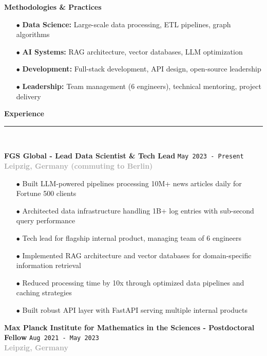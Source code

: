 \documentclass[11pt,a4paper]{article}
\newcommand{\sectiondivider}{%
    \vspace{2pt}\\%
    {\color{verdigris}\rule{30pt}{2pt}}\\%
    \vspace{8pt}%
}
\newcommand{\verdigrisbullet}{{\color{verdigris}$\bullet$}\space}
\newcommand{\jobduration}[1]{%
    \textcolor{mediumgray}{\texttt{\small #1}}%
}
\newcommand{\companyname}[1]{%
    \textcolor{darkgray}{\textbf{#1}}%
}
\newcommand{\cvsectioncustom}[1]{%
    \vspace{12pt}%
    {\Large\color{navy}\textbf{#1}}%
    \sectiondivider%
}
\begin{document}
\vspace{6pt}
\textbf{Methodologies \& Practices}
\begin{itemize}[leftmargin=15pt,itemsep=2pt]
    \item[\verdigrisbullet] \textbf{Data Science:} Large-scale data processing, ETL pipelines, graph algorithms
    \item[\verdigrisbullet] \textbf{AI Systems:} RAG architecture, vector databases, LLM optimization
    \item[\verdigrisbullet] \textbf{Development:} Full-stack development, API design, open-source leadership
    \item[\verdigrisbullet] \textbf{Leadership:} Team management (6 engineers), technical mentoring, project delivery
\end{itemize}

\cvsectioncustom{Experience}

\textbf{\large\color{navy}FGS Global - Lead Data Scientist \& Tech Lead} \hfill \jobduration{May 2023 - Present}\\
\companyname{Leipzig, Germany (commuting to Berlin)}

\begin{itemize}[leftmargin=15pt,itemsep=3pt]
    \item[\verdigrisbullet] Built LLM-powered pipelines processing 10M+ news articles daily for Fortune 500 clients
    \item[\verdigrisbullet] Architected data infrastructure handling 1B+ log entries with sub-second query performance
    \item[\verdigrisbullet] Tech lead for flagship internal product, managing team of 6 engineers
    \item[\verdigrisbullet] Implemented RAG architecture and vector databases for domain-specific information retrieval
    \item[\verdigrisbullet] Reduced processing time by 10x through optimized data pipelines and caching strategies
    \item[\verdigrisbullet] Built robust API layer with FastAPI serving multiple internal products
\end{itemize}

\vspace{8pt}

\textbf{\large\color{navy}Max Planck Institute for Mathematics in the Sciences - Postdoctoral Fellow} \hfill \jobduration{Aug 2021 - May 2023}\\
\companyname{Leipzig, Germany}
\end{document}
